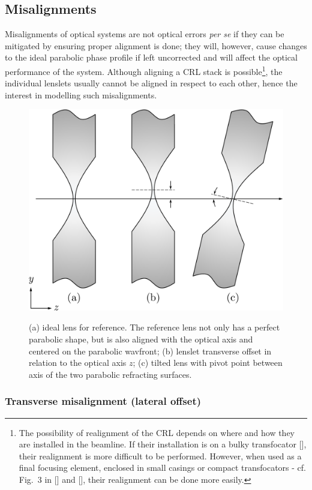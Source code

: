 \begin{refsection}
\subsection{Misalignments}

Misalignments of optical systems are not optical errors \textit{per se} if they can be mitigated by ensuring proper alignment is done; they will, however, cause changes to the ideal parabolic phase profile if left uncorrected and will affect the optical performance of the system. Although aligning a CRL stack is possible\footnote{The possibility of realignment of the CRL depends on where and how they are installed in the beamline. If their installation is on a bulky transfocator [\cite{Vaughan2011}], their realignment is more difficult to be performed. However, when used as a final focusing element, enclosed in small casings or compact transfocators - cf. Fig.~3 in [\cite{Lengeler1999}] and [\cite{Kornemann2017, Narikovich2019}], their realignment can be done more easily.}, the individual lenslets usually cannot be aligned in respect to each other, hence the interest in modelling such misalignments.

\begin{figure}[t]
    \centering
    {\includegraphics[width=0.4\linewidth]{figures/ch04/missalignments.pdf}}
    \caption[Single lens typical misalignment]{(a) ideal lens for reference. The reference lens not only has a perfect parabolic shape, but is also aligned with the optical axis and centered on the parabolic wavfront; (b) lenslet transverse offset in relation to the optical axis $z$; (c) tilted lens with pivot point between axis of the two parabolic refracting surfaces.}
    \label{fig:missaligments}
\end{figure}

\subsubsection*{Transverse misalignment (lateral offset)}


\end{refsection}
